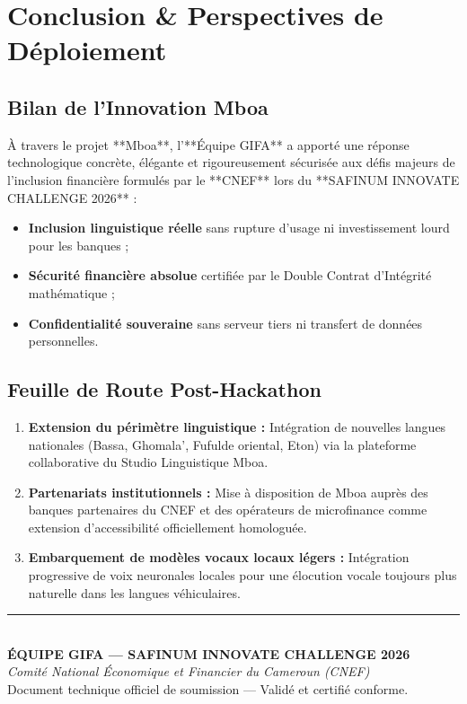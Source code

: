 \documentclass[10pt,a4paper]{article}
\begin{document}
\section{Conclusion \& Perspectives de Déploiement}

\subsection{Bilan de l'Innovation Mboa}
À travers le projet **Mboa**, l'**Équipe GIFA** a apporté une réponse technologique concrète, élégante et rigoureusement sécurisée aux défis majeurs de l'inclusion financière formulés par le **CNEF** lors du **SAFINUM INNOVATE CHALLENGE 2026** :
\begin{itemize}
  \item \textbf{Inclusion linguistique réelle} sans rupture d'usage ni investissement lourd pour les banques ;
  \item \textbf{Sécurité financière absolue} certifiée par le Double Contrat d'Intégrité mathématique ;
  \item \textbf{Confidentialité souveraine} sans serveur tiers ni transfert de données personnelles.
\end{itemize}

\subsection{Feuille de Route Post-Hackathon}
\begin{enumerate}
  \item \textbf{Extension du périmètre linguistique :} Intégration de nouvelles langues nationales (Bassa, Ghomala', Fufulde oriental, Eton) via la plateforme collaborative du Studio Linguistique Mboa.
  \item \textbf{Partenariats institutionnels :} Mise à disposition de Mboa auprès des banques partenaires du CNEF et des opérateurs de microfinance comme extension d'accessibilité officiellement homologuée.
  \item \textbf{Embarquement de modèles vocaux locaux légers :} Intégration progressive de voix neuronales locales pour une élocution vocale toujours plus naturelle dans les langues véhiculaires.
\end{enumerate}

\vspace{0.6cm}
\begin{center}
  \rule{0.6\textwidth}{0.5pt}\\[0.2cm]
  \textbf{\color{mboateal} ÉQUIPE GIFA --- SAFINUM INNOVATE CHALLENGE 2026}\\[0.05cm]
  \textit{Comité National Économique et Financier du Cameroun (CNEF)}\\[0.05cm]
  \footnotesize Document technique officiel de soumission --- Validé et certifié conforme.
\end{center}
\end{document}
